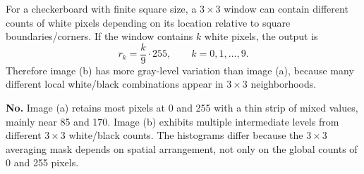 \documentclass[12pt]{article}
\begin{document}
\begin{stepbox}
For a checkerboard with finite square size, a $3\times 3$ window can contain different counts of white pixels depending on its location relative to square boundaries/corners. If the window contains $k$ white pixels, the output is
\[
r_k=\frac{k}{9}\cdot 255,\qquad k=0,1,\dots,9.
\]
Therefore image (b) has more gray-level variation than image (a), because many different local white/black combinations appear in $3\times 3$ neighborhoods.
\end{stepbox}

\begin{stepbox}
\textbf{No.} Image (a) retains most pixels at 0 and 255 with a thin strip of mixed values, mainly near 85 and 170. Image (b) exhibits multiple intermediate levels from different $3\times3$ white/black counts. The histograms differ because the $3\times3$ averaging mask depends on spatial arrangement, not only on the global counts of 0 and 255 pixels.
\end{stepbox}
\end{document}
